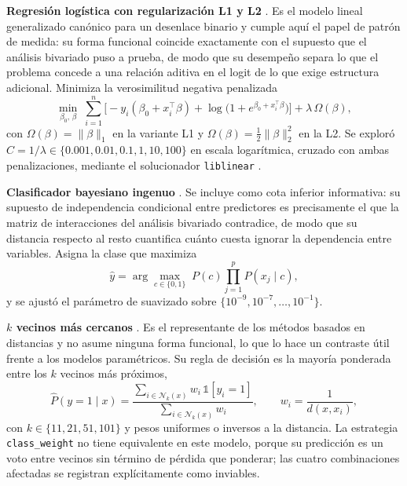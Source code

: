 \documentclass[pdflatex,sn-mathphys-num]{sn-jnl}
\begin{document}
\textbf{Regresión logística con regularización L1 y L2} \cite{bib_tibshirani}. Es el modelo lineal generalizado canónico para un desenlace binario y cumple aquí el papel de patrón de medida: su forma funcional coincide exactamente con el supuesto que el análisis bivariado puso a prueba, de modo que su desempeño separa lo que el problema concede a una relación aditiva en el logit de lo que exige estructura adicional. Minimiza la verosimilitud negativa penalizada
\begin{equation}
\min_{\beta_0,\,\beta} \; \sum_{i=1}^{n}\Big[-y_i(\beta_0 + x_i^\top\beta) + \log\big(1+e^{\beta_0 + x_i^\top\beta}\big)\Big] + \lambda\,\Omega(\beta),
\label{eq:logistica}
\end{equation}
con $\Omega(\beta)=\lVert\beta\rVert_1$ en la variante L1 y $\Omega(\beta)=\tfrac{1}{2}\lVert\beta\rVert_2^2$ en la L2. Se exploró $C = 1/\lambda \in \{0.001, 0.01, 0.1, 1, 10, 100\}$ en escala logarítmica, cruzado con ambas penalizaciones, mediante el solucionador \texttt{liblinear} \cite{bib_liblinear}.

\textbf{Clasificador bayesiano ingenuo} \cite{bib_zhang}. Se incluye como cota inferior informativa: su supuesto de independencia condicional entre predictores es precisamente el que la matriz de interacciones del análisis bivariado contradice, de modo que su distancia respecto al resto cuantifica cuánto cuesta ignorar la dependencia entre variables. Asigna la clase que maximiza
\begin{equation}
\hat{y} = \arg\max_{c\in\{0,1\}} \; P(c)\prod_{j=1}^{p} P(x_j \mid c),
\label{eq:bayes}
\end{equation}
y se ajustó el parámetro de suavizado sobre $\{10^{-9}, 10^{-7}, \dots, 10^{-1}\}$.

\textbf{$k$ vecinos más cercanos} \cite{bib_cover}. Es el representante de los métodos basados en distancias y no asume ninguna forma funcional, lo que lo hace un contraste útil frente a los modelos paramétricos. Su regla de decisión es la mayoría ponderada entre los $k$ vecinos más próximos,
\begin{equation}
\hat{P}(y=1\mid x) = \frac{\sum_{i \in \mathcal{N}_k(x)} w_i\,\mathbb{1}[y_i = 1]}{\sum_{i \in \mathcal{N}_k(x)} w_i},
\qquad w_i = \frac{1}{d(x, x_i)},
\label{eq:knn}
\end{equation}
con $k \in \{11, 21, 51, 101\}$ y pesos uniformes o inversos a la distancia. La estrategia \texttt{class\_weight} no tiene equivalente en este modelo, porque su predicción es un voto entre vecinos sin término de pérdida que ponderar; las cuatro combinaciones afectadas se registran explícitamente como inviables.
\end{document}
